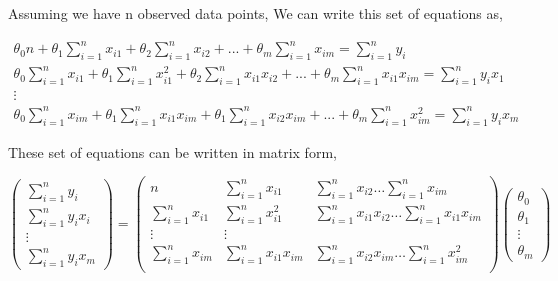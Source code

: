 \documentclass[english]{tktltiki}
\begin{document}
Assuming we have n observed data points, We can write this set of equations as,

\begin{eqnarray}
\theta_0 n + \theta_1 \sum_{i=1}^n x_{i1} + \theta_2 \sum_{i=1}^n x_{i2} + ... + \theta_m \sum_{i=1}^n x_{im} = \sum_{i=1}^n y_i \nonumber \\
\theta_0 \sum_{i=1}^n x_{i1} + \theta_1 \sum_{i=1}^n x_{i1}^2 + \theta_2 \sum_{i=1}^n x_{i1} x_{i2} +  ... + \theta_m \sum_{i=1}^n x_{i1} x_{im} = \sum_{i=1}^n y_i x_1 \nonumber \\
\vdots \nonumber \\
\theta_0 \sum_{i=1}^n x_{im} + \theta_1 \sum_{i=1}^n x_{i1} x_{im} + \theta_1 \sum_{i=1}^n x_{i2} x_{im} + ... + \theta_m \sum_{i=1}^n x_{im}^2 = \sum_{i=1}^n y_i x_m
\end{eqnarray}

These set of equations can be written in matrix form,

$$
\begin{pmatrix}
\sum_{i=1}^n y_i \\
\sum_{i=1}^n y_i x_i \\
\vdots \\
\sum_{i=1}^n y_i x_m
\end{pmatrix}
=%
\begin{pmatrix}
n & \sum_{i=1}^n x_{i1} & \sum_{i=1}^n x_{i2} \hdots \sum_{i=1}^n x_{im} \\
\sum_{i=1}^n x_{i1} & \sum_{i=1}^n x_{i1}^2 & \sum_{i=1}^n x_{i1} x_{i2} \hdots \sum_{i=1}^n x_{i1} x_{im} \\
\vdots&\vdots \\
\sum_{i=1}^n x_{im} & \sum_{i=1}^n x_{i1} x_{im} & \sum_{i=1}^n x_{i2} x_{im} \hdots \sum_{i=1}^n x_{im}^2 \\
\end{pmatrix}
%
\begin{pmatrix}
\theta_0 \\
\theta_1 \\
\vdots \\
\theta_m
\end{pmatrix}
$$
\end{document}
